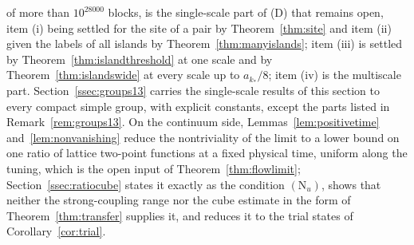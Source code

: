 \documentclass[11pt]{amsart}
\theoremstyle{definition}
\theoremstyle{remark}
\numberwithin{equation}{section}
\begin{document}
of more than $10^{28000}$ blocks, is the single-scale part of (D) that
remains open, item (i) being settled for the
site of a pair by Theorem~\ref{thm:site} and item (ii) given the labels
of all islands by Theorem~\ref{thm:manyislands};
item (iii) is settled by Theorem~\ref{thm:islandthreshold} at one scale
and by Theorem~\ref{thm:islandswide} at every scale up to $a_{k_*}/8$;
item (iv) is the multiscale part. Section~\ref{ssec:groups13} carries the single-scale results of this section to every compact simple group, with explicit constants, except the parts listed in Remark~\ref{rem:groups13}. On the continuum side, Lemmas~\ref{lem:positivetime}
and~\ref{lem:nonvanishing} reduce the nontriviality of the limit to a
lower bound on one ratio of lattice two-point functions at a fixed
physical time, uniform along the tuning, which is the open input of
Theorem~\ref{thm:flowlimit}; Section~\ref{ssec:ratiocube} states it exactly as the
condition $(\mathrm N_u)$, shows that neither the strong-coupling range nor
the cube estimate in the form of Theorem~\ref{thm:transfer} supplies it,
and reduces it to the trial states of Corollary~\ref{cor:trial}.
\end{document}
